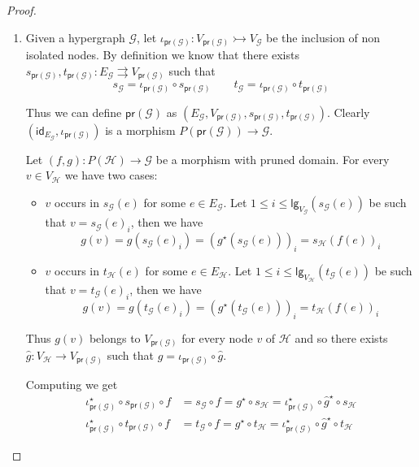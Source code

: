 \documentclass[3p]{elsarticle}
\newcommand{\lgh}{\mathsf{lg}}
\newcommand{\pr}{\mathsf{pr}}
\newcommand{\mto}{\rightarrowtail}
\newcommand{\id}[1]{\mathsf{id}_{#1}}
\theoremstyle{remark}
\theoremstyle{definition}
\begin{document}
\dx*
\begin{proof}\label{proof:dx}
	\begin{enumerate}
\item Given a hypergraph $\mathcal{G}$, let $\iota_{\pr(\mathcal{G})}\colon V_{\pr(\mathcal{G})}\mto V_{\mathcal{G}}$ be the inclusion of non isolated nodes. By definition we know that there exists $s_{\pr(\mathcal{G})}, t_{\pr(\mathcal{G})}\colon E_{\mathcal{G}}\rightrightarrows V_{\pr(\mathcal{G})}$ such that
\[s_{\mathcal{G}}=\iota_{\pr(\mathcal{G})}\circ s_{\pr(\mathcal{G})}\qquad t_{\mathcal{G}}=\iota_{\pr(\mathcal{G})}\circ t_{\pr(\mathcal{G})}\]
 
 Thus we can define $\pr(\mathcal{G})$ as $(E_{\mathcal{G}}, V_{\pr(\mathcal{G})}, s_{\pr(\mathcal{G})}, t_{\pr(\mathcal{G})})$. Clearly $(\id{E_{\mathcal{G}}}, \iota_{\pr(\mathcal{G})})$ is a morphism $P(\pr(\mathcal{G}))\to \mathcal{G}$.
 
 Let $(f,g)\colon P(\mathcal{H})\to \mathcal{G}$ be a morphism with pruned domain. For every $v \in V_{\mathcal{H}}$ we have two cases:
 \begin{itemize}
 	\item $v$ occurs in $s_{\mathcal{G}}(e)$ for some $e\in E_{\mathcal{G}}$. Let $1\leq i\leq \lgh_{V_{\mathcal{G}}}(s_{\mathcal{G}}(e))$ be such that $v=s_{\mathcal{G}}(e)_i$, then we have
 	\[g(v)=g(s_{\mathcal{G}}(e)_i)=(g^\star(s_{\mathcal{G}}(e)))_i=s_{\mathcal{H}}(f(e))_i\]
 	\item $v$ occurs in $t_{\mathcal{H}}(e)$ for some $e\in E_{\mathcal{H}}$. Let $1\leq i\leq \lgh_{V_{\mathcal{H}}}(t_{\mathcal{G}}(e))$ be such that $v=t_{\mathcal{G}}(e)_i$, then we have
 	\[g(v)=g(t_{\mathcal{G}}(e)_i)=(g^\star(t_{\mathcal{G}}(e)))_i=t_{\mathcal{H}}(f(e))_i\]
 \end{itemize}
 
 Thus $g(v)$ belongs to $V_{\pr(\mathcal{G})}$ for every node $v$ of $\mathcal{H}$ and so there exists $\hat{g}\colon V_{\mathcal{H}}\to V_{\pr(\mathcal{G})}$ such that $g=\iota_{\pr(\mathcal{G})}\circ \hat{g}$. 
 
 Computing we get
 \begin{align*}
 	\iota^\star_{\pr(\mathcal{G})}\circ s_{\pr(\mathcal{G})}\circ f &= s_{\mathcal{G}}\circ f = g^\star \circ s_{\mathcal{H}} = \iota^\star_{\pr(\mathcal{G})} \circ \hat{g}^\star \circ s_{\mathcal{H}} \\
 	\iota^\star_{\pr(\mathcal{G})}\circ t_{\pr(\mathcal{G})}\circ f &= t_{\mathcal{G}}\circ f = g^\star \circ t_{\mathcal{H}} = \iota^\star_{\pr(\mathcal{G})} \circ \hat{g}^\star \circ t_{\mathcal{H}}
 \end{align*}
 

\end{enumerate}
\end{proof}
\end{document}
